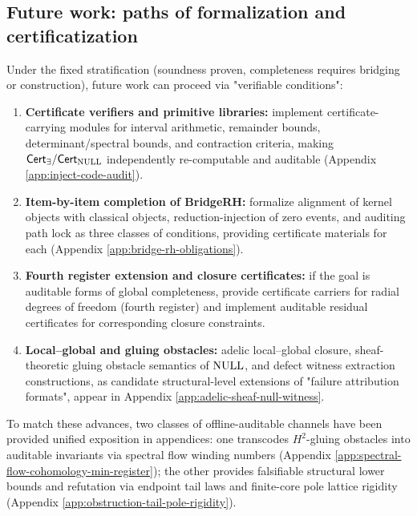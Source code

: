 \subsection{Future work: paths of formalization and certificatization}
Under the fixed stratification (soundness proven, completeness requires bridging or construction), future work can proceed via "verifiable conditions":
\begin{enumerate}
  \item \textbf{Certificate verifiers and primitive libraries:} implement certificate-carrying modules for interval arithmetic, remainder bounds, determinant/spectral bounds, and contraction criteria, making $\mathsf{Cert}_\exists/\mathsf{Cert}_{\mathrm{NULL}}$ independently re-computable and auditable (Appendix \ref{app:inject-code-audit}).\par
  \item \textbf{Item-by-item completion of BridgeRH:} formalize alignment of kernel objects with classical objects, reduction-injection of zero events, and auditing path lock as three classes of conditions, providing certificate materials for each (Appendix \ref{app:bridge-rh-obligations}).\par
  \item \textbf{Fourth register extension and closure certificates:} if the goal is auditable forms of global completeness, provide certificate carriers for radial degrees of freedom (fourth register) and implement auditable residual certificates for corresponding closure constraints.\par
  \item \textbf{Local--global and gluing obstacles:} adelic local--global closure, sheaf-theoretic gluing obstacle semantics of $\mathrm{NULL}$, and defect witness extraction constructions, as candidate structural-level extensions of "failure attribution formats", appear in Appendix \ref{app:adelic-sheaf-null-witness}.\par
\end{enumerate}

To match these advances, two classes of offline-auditable channels have been provided unified exposition in appendices: one transcodes $H^2$-gluing obstacles into auditable invariants via spectral flow winding numbers (Appendix \ref{app:spectral-flow-cohomology-min-register}); the other provides falsifiable structural lower bounds and refutation via endpoint tail laws and finite-core pole lattice rigidity (Appendix \ref{app:obstruction-tail-pole-rigidity}).\par
